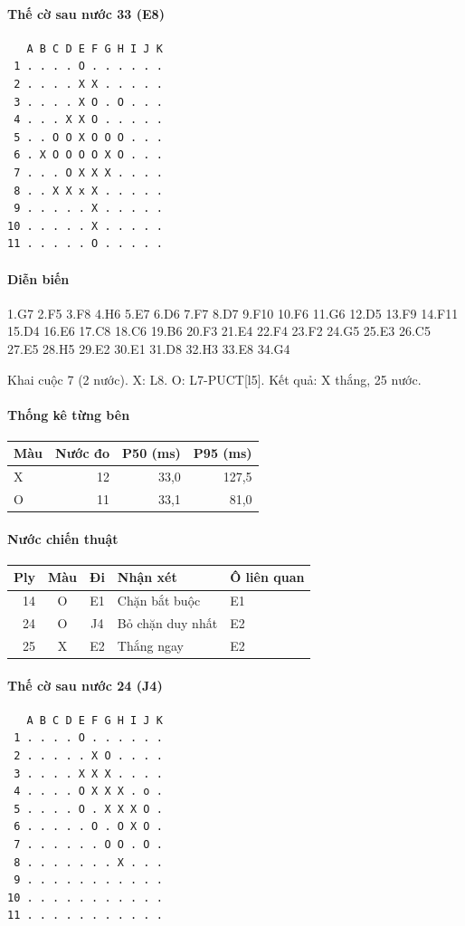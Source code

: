 \paragraph{Thế cờ sau nước 33 (E8)}
\begin{verbatim}
   A B C D E F G H I J K
 1 . . . . O . . . . . .
 2 . . . . X X . . . . .
 3 . . . . X O . O . . .
 4 . . . X X O . . . . .
 5 . . O O X O O O . . .
 6 . X O O O O X O . . .
 7 . . . O X X X . . . .
 8 . . X X x X . . . . .
 9 . . . . . X . . . . .
10 . . . . . X . . . . .
11 . . . . . O . . . . .
\end{verbatim}
\paragraph{Diễn biến}
{\footnotesize 1.G7 2.F5 3.F8 4.H6 5.E7 6.D6 7.F7 8.D7 9.F10 10.F6 11.G6 12.D5 13.F9 14.F11 15.D4 16.E6 17.C8 18.C6 19.B6 20.F3 21.E4 22.F4 23.F2 24.G5 25.E3 26.C5 27.E5 28.H5 29.E2 30.E1 31.D8 32.H3 33.E8 34.G4\par}
Khai cuộc 7 (2 nước). X: L8. O: L7-PUCT[l5]. Kết quả: X thắng, 25 nước.
\paragraph{Thống kê từng bên}
\begin{center}\small
\begin{tabular}{@{}lrrr@{}}
\toprule
Màu & Nước đo & P50 (ms) & P95 (ms) \\
\midrule
X & 12 & 33,0 & 127,5 \\
O & 11 & 33,1 & 81,0 \\
\bottomrule
\end{tabular}
\end{center}
\paragraph{Nước chiến thuật}
\begin{center}\small
\begin{tabular}{@{}rccll@{}}
\toprule
Ply & Màu & Đi & Nhận xét & Ô liên quan \\
\midrule
14 & O & E1 & Chặn bắt buộc & E1 \\
24 & O & J4 & Bỏ chặn duy nhất & E2 \\
25 & X & E2 & Thắng ngay & E2 \\
\bottomrule
\end{tabular}
\end{center}
\paragraph{Thế cờ sau nước 24 (J4)}
\begin{verbatim}
   A B C D E F G H I J K
 1 . . . . O . . . . . .
 2 . . . . . X O . . . .
 3 . . . . X X X . . . .
 4 . . . . O X X X . o .
 5 . . . . O . X X X O .
 6 . . . . . O . O X O .
 7 . . . . . . O O . O .
 8 . . . . . . . X . . .
 9 . . . . . . . . . . .
10 . . . . . . . . . . .
11 . . . . . . . . . . .
\end{verbatim}
